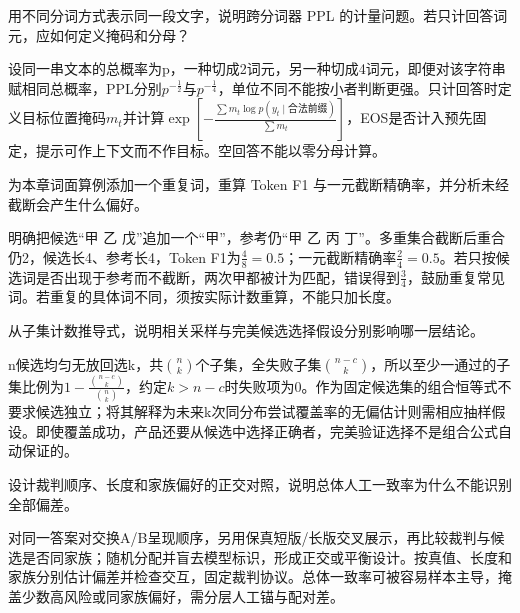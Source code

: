 \begin{exercises}
\begin{exercise} 用不同分词方式表示同一段文字，说明跨分词器 PPL 的计量问题。若只计回答词元，应如何定义掩码和分母？

\begin{solution}
设同一串文本的总概率为p，一种切成2词元，另一种切成4词元，即便对该字符串赋相同总概率，PPL分别$p^{-\frac{1}{2}}$与$p^{-\frac{1}{4}}$，单位不同不能按小者判断更强。只计回答时定义目标位置掩码$m_t$并计算$\exp[-\frac{\sum m_t\log p(y_t\mid\text{合法前缀})}{\sum m_t}]$，EOS是否计入预先固定，提示可作上下文而不作目标。空回答不能以零分母计算。
\end{solution}
\end{exercise}

\begin{exercise} 为本章词面算例添加一个重复词，重算 Token F1 与一元截断精确率，并分析未经截断会产生什么偏好。

\begin{solution}
明确把候选“甲 乙 戊”追加一个“甲”，参考仍“甲 乙 丙 丁”。多重集合截断后重合仍2，候选长4、参考长4，Token F1为$\frac{4}{8}=0.5$；一元截断精确率$\frac{2}{4}=0.5$。若只按候选词是否出现于参考而不截断，两次甲都被计为匹配，错误得到$\frac{3}{4}$，鼓励重复常见词。若重复的具体词不同，须按实际计数重算，不能只加长度。
\end{solution}
\end{exercise}

\begin{exercise} 从子集计数推导式，说明相关采样与完美候选选择假设分别影响哪一层结论。

\begin{solution}
n候选均匀无放回选k，共$\binom nk$个子集，全失败子集$\binom{n-c}k$，所以至少一通过的子集比例为$1-\frac{\binom{n-c}k}{\binom nk}$，约定$k>n-c$时失败项为0。作为固定候选集的组合恒等式不要求候选独立；将其解释为未来k次同分布尝试覆盖率的无偏估计则需相应抽样假设。即使覆盖成功，产品还要从候选中选择正确者，完美验证选择不是组合公式自动保证的。
\end{solution}
\end{exercise}

\begin{exercise} 设计裁判顺序、长度和家族偏好的正交对照，说明总体人工一致率为什么不能识别全部偏差。

\begin{solution}
对同一答案对交换A/B呈现顺序，另用保真短版/长版交叉展示，再比较裁判与候选是否同家族；随机分配并盲去模型标识，形成正交或平衡设计。按真值、长度和家族分别估计偏差并检查交互，固定裁判协议。总体一致率可被容易样本主导，掩盖少数高风险或同家族偏好，需分层人工锚与配对差。
\end{solution}
\end{exercise}


\end{exercises}
